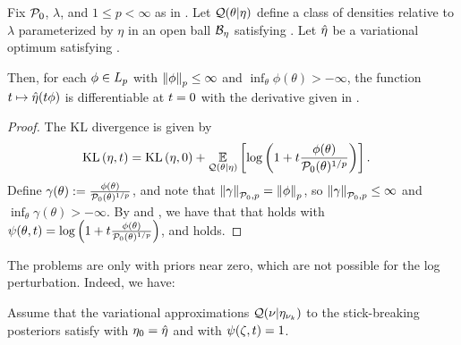 \begin{thm}
%
Fix $\mathcal{P}_{0}$, $\lambda$, and $1 \le p < \infty$ as in .
Let $\mathcal{Q}(\theta \vert \eta)$ define a class of densities relative to $\lambda$
parameterized by $\eta$ in an open ball $\mathcal{B}_\eta$ satisfying
.  Let $\hat\eta$ be a variational optimum satisfying
.

Then, for each $\phi \in {L_{p}}$ with $\left\Vert\phi\right\Vert_p \le \infty$ and
$\inf_\theta \phi(\theta) > -\infty$, the function $t \mapsto \hat\eta(t \phi)$
is differentiable at $t = 0$ with the derivative given in
.
%
\begin{proof}
%
The KL divergence is given by
%
\begin{align*}
%
\KL{\eta, \t} ={}&
    \KL{\eta, 0} +
    \expect{\q(\theta \vert \eta)}
           {\log \left(1 + \t \frac{\phi(\theta)}{\pbase(\theta)^{1/p}} \right)}.
%
\end{align*}
%
Define $\gamma(\theta) := \frac{\phi(\theta)}{\mathcal{P}_{0}(\theta)^{1/p}}$, and note
that $\left\Vert\gamma\right\Vert_{\mathcal{P}_{0}, p} = \left\Vert\phi\right\Vert_{p}$, so $\left\Vert\gamma\right\Vert_{\mathcal{P}_{0},
p} \le \infty$ and $\inf_\theta \gamma(\theta) > -\infty$.  By
 and , we have that that
 holds with $\psi(\theta, t) = \log \left(1 + t
\frac{\phi(\theta)}{\mathcal{P}_{0}(\theta)^{1/p}}\right)$, and 
holds.
%
\end{proof}
%
\end{thm}


The problems are only with priors near zero, which are not possible for
the log perturbation.  Indeed, we have:


\begin{assu}
%
Assume that the variational approximations $\mathcal{Q}(\nu \vert \eta_{\nu_{k}})$ to the
stick-breaking posteriors satisfy  with $\eta_0 =
\hat\eta$ and with $\psi(\zeta, t) = 1$.
%
\end{assu}


